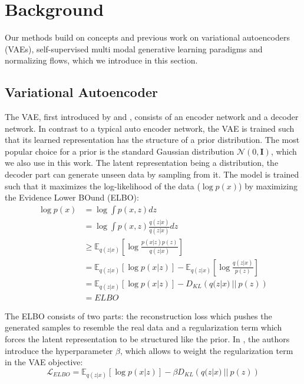 \chapter{Background}
Our methods build on concepts and previous work on variational autoencoders (VAEs), self-supervised multi modal generative learning paradigms and normalizing flows, which we introduce in this section.


\section{Variational Autoencoder}
\label{subsec:vae}
The VAE, first introduced by \citep{kingma_auto-encoding_2014} and \citep{rezende_stochastic_2014}, consists of an encoder network and a decoder network.
In contrast to a typical auto encoder network, the VAE is trained such that its learned representation has the structure of a prior distribution.
The most popular choice for a prior is the standard Gaussian distribution $\mathcal{N}(0,\textbf{I})$, which we also use in this work.
The latent representation being a distribution, the decoder part can generate unseen data by sampling from it.
The model is trained such that it maximizes the log-likelihood of the data ($\log p(x)$) by maximizing the Evidence Lower BOund (ELBO):
\begin{equation}
    \label{vaeelbo}
    \begin{split}
        \log p(x) &= \log \int p(x,z) dz\\
        &=  \log \int p(x,z) \frac{q(z|x)}{q(z|x)}dz\\
        &\geq \mathbb{E} _{q(z|x)}[\log \frac{p(x|z)p(z)}{q(z|x)}]\\
        &= \mathbb{E} _{q(z|x)}[\log p(x|z)] - \mathbb{E} _{q(z|x)}[\log \frac{q(z|x)}{p(z)}]\\
        &= \mathbb{E} _{q(z|x)}[\log p(x|z)] - D_{KL}\left( q(z|x)\ ||\ p(z)\right)\\
        &= ELBO
    \end{split}
\end{equation}

The ELBO consists of two parts: the reconstruction loss which pushes the generated samples to resemble the real data and a regularization term which forces the latent representation to be structured like the prior.
In \citep{beta_vae}, the authors introduce the hyperparameter $\beta$, which allows to weight the regularization term in the VAE objective:
\begin{equation}
    \label{eq:vaeelbo}
    \mathcal{L}_{ELBO} = \mathbb{E} _{q(z|x)}[\log p(x|z)] - \beta D_{KL}\left( q(z|x)\ ||\ p(z)\right)
\end{equation}

